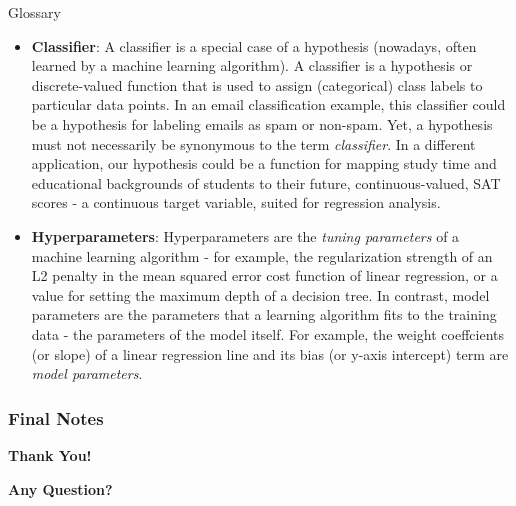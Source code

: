 \documentclass[compress,oilve]{beamer}
\begin{document}
\begin{frame}{Glossary}
\begin{itemize}

\item \textbf{Classifier}: A classifier is a special case of a hypothesis (nowadays, often learned by a machine learning algorithm). A classifier is a hypothesis or discrete-valued function that is used to assign (categorical) class labels to particular data points. In an email classification example, this classifier could be a hypothesis for labeling emails as spam or non-spam. Yet, a hypothesis must not necessarily be synonymous to the term \textit{classifier}. In a different application, our hypothesis could be a function for mapping study time and educational backgrounds of students to their future, continuous-valued, SAT scores - a continuous target variable, suited for regression analysis.
\item \textbf{Hyperparameters}: Hyperparameters are the \textit{tuning parameters} of a machine learning algorithm - for example, the regularization strength of an L2 penalty in the mean squared error cost function of linear regression, or a value for setting the maximum depth of a decision tree. In contrast, model parameters are the parameters that a learning algorithm fits to the training data - the parameters of the model itself. For example, the weight coeffcients (or slope) of a linear regression line and its bias (or y-axis intercept) term are \textit{model parameters}.
\end{itemize}
\end{frame}


\frametitle{Final Notes}
\centering
\vspace{50 pt}
\textbf{Thank You!}
\vspace{50pt}

\textbf{Any Question?}
\end{document}
